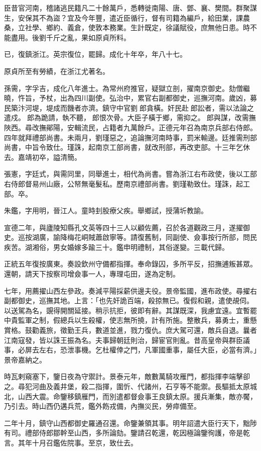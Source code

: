 \begin{pinyinscope}
臣昔官河南，稽諸逃民籍凡二十餘萬戶，悉轉徙南陽、唐、鄧、襄、樊間。群聚謀生，安保其不為盜？宜及今年豐，遣近臣循行，督有司籍為編戶，給田業，課農桑，立社學、鄉約、義倉，使敦本務業。生計既定，徐議賦役，庶無他日患。時不能盡用。後劉千斤之亂，果如原貞所料。

已，復鎮浙江。英宗復位，罷歸。成化十年卒，年八十七。

原貞所至有勞績，在浙江尤著名。

孫需，字孚吉，成化八年進士。為常州府推官，疑獄立剖，擢南京御史。劾僧繼曉，忤旨，予杖，出為四川副使。弘治中，累官右副都御史，巡撫河南。歲凶，募民築汴河堤，堤成而饑者亦濟。鎮守中官劉郎貪橫。奸民赴郎訟者，需以法論之遣戍。郎為跪請，執不聽，郎恨次骨。大臣子橫于鄉，需抑之。郎與謀，改需撫陜西。尋改撫鄖陽，安輯流民，占籍者九萬餘戶。正德元年召為南京兵部右侍郎。四年就拜禮部尚書。未兩月，劉瑾惡之，追論撫河南時事，罰米輸邊。廷推需刑部尚書，中旨令致仕。瑾誅，起南京工部尚書，就改刑部，再改吏部。十三年乞休去。嘉靖初卒，謚清簡。

張憲，字廷式，與需同里，同舉進士，相代為尚書。嘗為浙江右布政使，後以工部右侍郎督易州山廠，公帑無毫髮私。歷南京禮部尚書。劉瑾勒致仕。瑾誅，起工部。卒。

朱鑑，字用明，晉江人。童時刲股療父疾。舉鄉試，授蒲圻教諭。

宣德二年，與廬陵知縣孔文英等四十三人以顧佐薦，召於各道觀政三月，遂擢御史。巡按湖廣，諭降梅花峒賊蕭啟寧等。請復舊制，同副使、僉事按行所部，問民疾苦。湖湘俗，男女婚嫁多踰三十。鑑申明禮制，其俗遂變。三載代歸。

正統五年復按廣東。奏設欽州守備都指揮。奉命錄囚，多所平反，招撫逋叛甚眾。還朝，請天下按察司增僉事一人，專理屯田，遂為定制。

七年，用薦擢山西左參政。奏減平陽採薪供邊夫役。景帝監國，進布政使。尋擢右副都御史，巡撫其地。上言：「也先奸詭百端，殺掠無已。復假和親，遣使覘伺。以送駕為名，覬得開關延接。稍示抗拒，彼即有辭。其謀既深，我慮宜遠。宜暫罷中貴監軍之制，假總兵以生殺權，使志無所撓，計有所施。整散兵，募勇士，重懸賞格。鼓勸義旅，徵勤王兵，數道並進，戮力復仇。庶大駕可還，敵兵自退。曩者江南寇發，皆以誅王振為名。夫事歸朝廷則治，歸宦官則亂。昔高皇帝與群臣議事，必屏去左右，恐泄事機。乞杜權倖之門，凡軍國重事，屬任大臣，必當有濟。」景帝嘉納之。

時瓦剌窺塞下，鑒日夜為守禦計。景泰元年，敵數萬騎攻雁門，都指揮李端擊卻之。尋犯河曲及義井堡，殺二指揮，圍忻、代諸州，石亨等不能禦。長驅抵太原城北，山西大震。命鑒移鎮雁門，而別遣都督僉事王良鎮太原。援兵漸集，敵亦饜，乃引去。時山西仍遘兵荒，鑑外飭戎備，內撫災民，勞瘁備至。

二年十月，鎮守山西都御史羅通召還。命鑒兼領其事。明年詔遣大臣行天下，黜陟有司。禮部侍郎鄒幹至山西，多所論劾。鑒請召乾還，乾因極論鑒徇護，帝是乾言。其年十月召鑑佐院事。至京，致仕去。


\end{pinyinscope}
